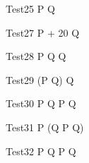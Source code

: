 \begin{circus}
   \circprocess Test25 \circdef  P \circtimedinterrupt {} \rcirctime Q  \\
\end{circus}


 
\begin{circus}
   \circprocess Test27 \circdef  P \circtimedinterrupt {} + 20 \rcirctime Q  \\
\end{circus}


\begin{circus}
    \circprocess Test28 \circdef  P \circseq Q \circtimedinterrupt {} \rcirctime Q  \\
\end{circus}
 
\begin{circus}
    \circprocess Test29 \circdef  (P \circseq Q) \circtimedinterrupt {} \rcirctime Q \\
\end{circus}

\begin{circus}
   \circprocess Test30 \circdef  P \circseq Q \circtimedinterrupt {} \rcirctime  P \circseq Q \\
\end{circus}
 
\begin{circus}
    \circprocess Test31 \circdef  P \circseq (Q \circtimedinterrupt {} \rcirctime P \circseq Q)\\
\end{circus}

\begin{circus}
    \circprocess Test32 \circdef  P \circtimedinterrupt {} \rcirctime Q \circtimedinterrupt {} \rcirctime P \circseq Q\\
\end{circus}


 

